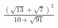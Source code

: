 \begin{ex}[type=calculate]
	\begin{condition}
		\( \dfrac{(\sqrt{13}+\sqrt{7})^2}{10+\sqrt{91}} \)
	\end{condition}
\end{ex}